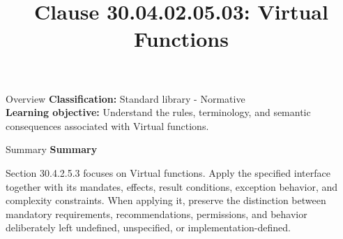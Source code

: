 \documentclass[10pt,letterpaper]{article}
\title{Clause 30.04.02.05.03: Virtual Functions}
\author{}
\date{}
\begin{document}
\maketitle
\begin{CornellOverviewBox}{Overview}
\textbf{Classification:} Standard library - Normative\\[2pt]
\textbf{Learning objective:} Understand the rules, terminology, and semantic consequences associated with Virtual functions.
\end{CornellOverviewBox}\begin{CornellSummaryBox}{Summary}
{\sffamily\bfseries\color{Accent} Summary}\par\vspace{3pt}Section 30.4.2.5.3 focuses on Virtual functions. Apply the specified interface together with its mandates, effects, result conditions, exception behavior, and complexity constraints. When applying it, preserve the distinction between mandatory requirements, recommendations, permissions, and behavior deliberately left undefined, unspecified, or implementation-defined.
\end{CornellSummaryBox}
\end{document}

